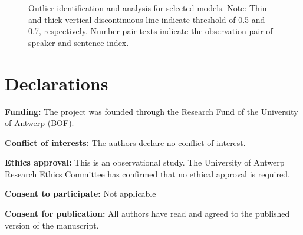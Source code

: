 \documentclass[
]{agujournal2019}
\begin{document}
\label{cell-fig-rq3-model-outliers}
\begin{figure}[H]


\caption{\label{fig-rq3-model-outliers}Outlier identification and
analysis for selected models. Note: Thin and thick vertical
discontinuous line indicate threshold of 0.5 and 0.7, respectively.
Number pair texts indicate the observation pair of speaker and sentence
index.}

\end{figure}%

\newpage{}

\section*{Declarations}\label{declarations}

\textbf{Funding:} The project was founded through the Research Fund of
the University of Antwerp (BOF).

\textbf{Conflict of interests:} The authors declare no conflict of
interest.

\textbf{Ethics approval:} This is an observational study. The University
of Antwerp Research Ethics Committee has confirmed that no ethical
approval is required.

\textbf{Consent to participate:} Not applicable

\textbf{Consent for publication:} All authors have read and agreed to
the published version of the manuscript.
\end{document}
